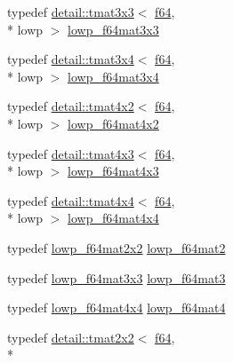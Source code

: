 \begin{DoxyCompactItemize}
\item 
typedef \hyperlink{structglm_1_1detail_1_1tmat3x3}{detail\-::tmat3x3}$<$ \hyperlink{group__gtc__type__precision_ga2bba392e555124b36cde6abba349bab3}{f64}, \\*
lowp $>$ \hyperlink{group__gtc__type__precision_ga3b636bef3048da2f7935eae13e66f7b3}{lowp\-\_\-f64mat3x3}
\item 
typedef \hyperlink{structglm_1_1detail_1_1tmat3x4}{detail\-::tmat3x4}$<$ \hyperlink{group__gtc__type__precision_ga2bba392e555124b36cde6abba349bab3}{f64}, \\*
lowp $>$ \hyperlink{group__gtc__type__precision_ga988c6645dead17a842c47ec042b5369e}{lowp\-\_\-f64mat3x4}
\item 
typedef \hyperlink{structglm_1_1detail_1_1tmat4x2}{detail\-::tmat4x2}$<$ \hyperlink{group__gtc__type__precision_ga2bba392e555124b36cde6abba349bab3}{f64}, \\*
lowp $>$ \hyperlink{group__gtc__type__precision_ga37d10de43251a9a1be734bbb340ad2e7}{lowp\-\_\-f64mat4x2}
\item 
typedef \hyperlink{structglm_1_1detail_1_1tmat4x3}{detail\-::tmat4x3}$<$ \hyperlink{group__gtc__type__precision_ga2bba392e555124b36cde6abba349bab3}{f64}, \\*
lowp $>$ \hyperlink{group__gtc__type__precision_ga05dba0f9d45301c7b10a9276c60b8a0e}{lowp\-\_\-f64mat4x3}
\item 
typedef \hyperlink{structglm_1_1detail_1_1tmat4x4}{detail\-::tmat4x4}$<$ \hyperlink{group__gtc__type__precision_ga2bba392e555124b36cde6abba349bab3}{f64}, \\*
lowp $>$ \hyperlink{group__gtc__type__precision_gab7d0922ed8d93ee3ce995858feb41231}{lowp\-\_\-f64mat4x4}
\item 
typedef \hyperlink{group__gtc__type__precision_ga38e41c5332b4eb20b23b4ed1f06608d4}{lowp\-\_\-f64mat2x2} \hyperlink{group__gtc__type__precision_ga2984b3b0b6ee0657044d186bb875b4e3}{lowp\-\_\-f64mat2}
\item 
typedef \hyperlink{group__gtc__type__precision_ga3b636bef3048da2f7935eae13e66f7b3}{lowp\-\_\-f64mat3x3} \hyperlink{group__gtc__type__precision_ga4acbda53fb7ff9568c0a2786fad450b8}{lowp\-\_\-f64mat3}
\item 
typedef \hyperlink{group__gtc__type__precision_gab7d0922ed8d93ee3ce995858feb41231}{lowp\-\_\-f64mat4x4} \hyperlink{group__gtc__type__precision_ga4378d9384f1b24848043ccb02dcf2959}{lowp\-\_\-f64mat4}
\item 
typedef \hyperlink{structglm_1_1detail_1_1tmat2x2}{detail\-::tmat2x2}$<$ \hyperlink{group__gtc__type__precision_ga2bba392e555124b36cde6abba349bab3}{f64}, \\*

\end{DoxyCompactItemize}
